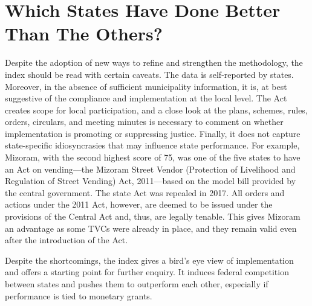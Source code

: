 \documentclass[a4paper, 12pt, twoside]{article}
\begin{document}
\section*{Which States Have Done Better Than The Others?}


	Despite the adoption of new ways to refine and strengthen the methodology, the index should be read with certain caveats. The data is self-reported by states. Moreover, in the absence of sufficient municipality information, it is, at best suggestive of the compliance and implementation at the local level. The Act creates scope for local participation, and a close look at the plans, schemes, rules, orders, circulars, and meeting minutes is necessary to comment on whether implementation is  promoting or suppressing justice. Finally, it does not capture state-specific idiosyncrasies that may influence state performance. For example, Mizoram, with the second highest score of 75, was one of the five states to have an Act on vending—the Mizoram Street Vendor (Protection of Livelihood and Regulation of Street Vending) Act, 2011—based on the model bill provided by the central government. The state Act was repealed in 2017. All orders and actions under the 2011 Act, however, are deemed to be issued under the provisions of the Central Act and, thus, are legally tenable. This gives Mizoram an advantage as some TVCs were already in place, and they remain valid even after the introduction of the Act.

	Despite the shortcomings, the index gives a bird’s eye view of implementation and offers a starting point for further enquiry. It induces federal competition between states and pushes them to outperform each other, especially if performance is tied to monetary grants.
\end{document}
